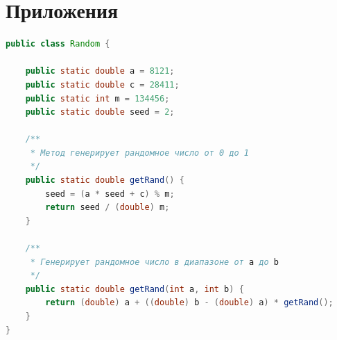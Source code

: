 \documentclass[a4paper,12pt]{article}
\begin{document}
\newpage\section{Приложения}

\begin{lstlisting}[language=Java, title=Генератор случайных чисел]
public class Random {

    public static double a = 8121;
    public static double c = 28411;
    public static int m = 134456;
    public static double seed = 2;

    /**
     * Метод генерирует рандомное число от 0 до 1
     */
    public static double getRand() {
        seed = (a * seed + c) % m;
        return seed / (double) m;
    }

    /**
     * Генерирует рандомное число в диапазоне от a до b
     */
    public static double getRand(int a, int b) {
        return (double) a + ((double) b - (double) a) * getRand();
    }
}


\end{lstlisting}
\end{document}
